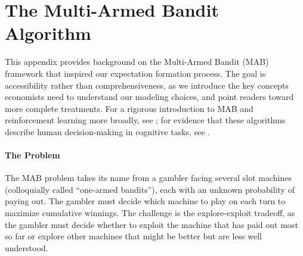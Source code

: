 \documentclass[10pt]{article}
\begin{document}
\newpage




\newpage
\appendix


\section{The Multi-Armed Bandit Algorithm}
  \label{app:mab}

This appendix provides background on the Multi-Armed Bandit (MAB) framework that inspired our expectation formation process. The goal is accessibility rather than comprehensiveness, as we introduce the key concepts economists need to understand our modeling choices, and point readers toward more complete treatments. For a rigorous introduction to MAB and reinforcement learning more broadly, see \citet{sutton2018reinforcement}; for evidence that these algorithms describe human decision-making in cognitive tasks, see \citet{binz2023}.

\paragraph{The Problem} The MAB problem takes its name from a gambler facing several slot machines (colloquially called ``one-armed bandits''), each with an unknown probability of paying out. The gambler must decide which machine to play on each turn to maximize cumulative winnings. The challenge is the explore-exploit tradeoff, as the gambler must decide whether to exploit the machine that has paid out most so far or explore other machines that might be better but are less well understood.
\end{document}
